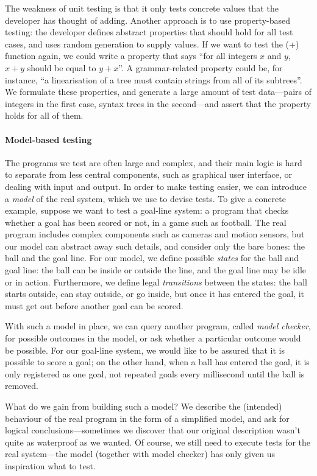 The weakness of unit testing is that it only tests concrete values
that the developer has thought of adding. Another approach is to use
property-based testing: the developer defines abstract properties that
should hold for all test cases, and uses random generation to supply
values. If we want to test the (+) function again, we could write a
property that says ``for all integers $x$ and $y$, $x+y$ should be
equal to $y+x$''.  A grammar-related property could be, for instance,
``a linearisation of a tree must contain strings from all of its
subtrees''.  We formulate these properties, and generate a large
amount of test data---pairs of integers in the first case, syntax trees in
the second---and assert that the property holds for all of them.

\paragraph{Model-based testing}
The programs we test are often large and complex, and their main logic is hard to
separate from less central components, such as graphical user interface, or
dealing with input and output. In order to make testing easier, we can introduce
a \emph{model} of the real system, which we use to devise tests. To give a concrete
example, suppose we want to test a goal-line system: a program that checks whether
a goal has been scored or not, in a game such as football. The real program includes
complex components such as cameras and motion sensors, but our model can abstract
away such details, and consider only the bare bones: the ball and the goal line.
For our model, we define possible \emph{states} for the ball and goal line: the
ball can be inside or outside the line, and the goal line may be idle or in action.
Furthermore, we define legal \emph{transitions} between the states: the ball starts
outside, can stay outside, or go inside, but once it has entered the goal, it must
get out before another goal can be scored.

With such a model in place, we can query another program, called \emph{model checker},
for possible outcomes in the model, or ask whether a particular outcome would be
possible. For our goal-line system, we would like to be assured that it is possible
to score a goal; on the other hand, when a ball has entered the goal, it is only
registered as one goal, not repeated goals every millisecond until the ball is
removed.

What do we gain from building such a model? We describe the (intended) behaviour
of the real program in the form of a simplified model, and ask for logical
conclusions---sometimes we discover that our original description wasn't quite
as waterproof as we wanted. Of course, we still need to execute tests for the
real system---the model (together with model checker) has only given us inspiration
what to test.


